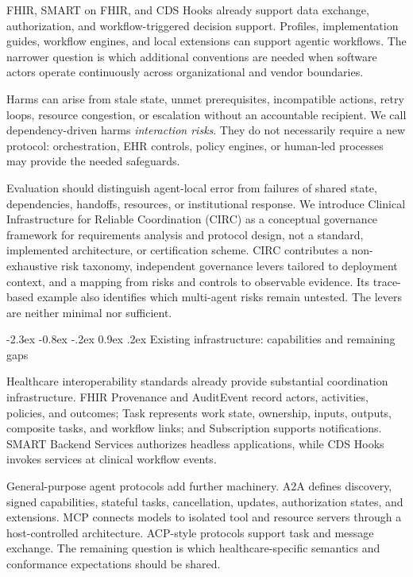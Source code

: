 \documentclass[10pt]{article}
\makeatletter
\renewcommand\section{\@startsection{section}{1}{\z@}%
  {-2.3ex \@plus -0.8ex \@minus -.2ex}%
  {0.9ex \@plus .2ex}%
  {\normalfont\sffamily\bfseries\normalsize}}
\makeatother
\begin{document}
FHIR, SMART on FHIR, and CDS Hooks already support data exchange, authorization, and
workflow-triggered decision support.\cite{hl7fhir2019,hl7cdshooks2018,mandel2016smart} Profiles,
implementation guides, workflow engines, and local extensions can support agentic workflows. The
narrower question is which additional conventions are needed when software actors operate
continuously across organizational and vendor boundaries.

Harms can arise from stale state, unmet prerequisites, incompatible actions, retry loops, resource
congestion, or escalation without an accountable recipient. We call dependency-driven harms
\emph{interaction risks}. They do not necessarily require a new protocol: orchestration, EHR
controls, policy engines, or human-led processes may provide the needed safeguards.

Evaluation should distinguish agent-local error from failures of shared state, dependencies,
handoffs, resources, or institutional response. We introduce Clinical Infrastructure for Reliable
Coordination (CIRC) as a conceptual governance framework for requirements analysis and protocol
design, not a standard, implemented architecture, or certification scheme. CIRC contributes a
non-exhaustive risk taxonomy, independent governance levers tailored to deployment context, and a
mapping from risks and controls to observable evidence. Its trace-based example also identifies which
multi-agent risks remain untested. The levers are neither minimal nor sufficient.

\section{Existing infrastructure: capabilities and remaining gaps}

Healthcare interoperability standards already provide substantial coordination infrastructure.
FHIR Provenance and AuditEvent record actors, activities, policies, and outcomes; Task represents
work state, ownership, inputs, outputs, composite tasks, and workflow links; and Subscription supports
notifications. SMART Backend Services authorizes headless applications, while CDS Hooks invokes
services at clinical workflow events.\cite{hl7v251,hl7fhir2019,mandel2016smart,hl7cdshooks2018,
hl7smart2024}

General-purpose agent protocols add further machinery. A2A defines discovery, signed capabilities,
stateful tasks, cancellation, updates, authorization states, and extensions.\cite{googlea2a2025,
a2aspec2026} MCP connects models to isolated tool and resource servers through a host-controlled
architecture.\cite{anthropicmcp2024,mcpspec2025} ACP-style protocols support task and message
exchange.\cite{ibmacp2025} The remaining question is which healthcare-specific semantics and
conformance expectations should be shared.
\end{document}
